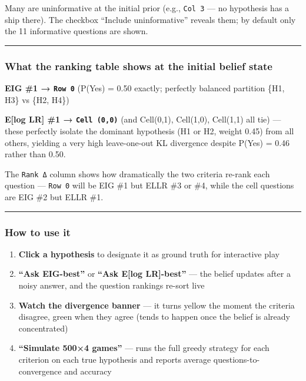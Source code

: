 \documentclass[
]{article}
\providecommand{\tightlist}{%
  \setlength{\itemsep}{0pt}\setlength{\parskip}{0pt}}
\begin{document}
Many are uninformative at the initial prior (e.g., \texttt{Col\ 3} ---
no hypothesis has a ship there). The checkbox ``Include uninformative''
reveals them; by default only the 11 informative questions are shown.

\begin{center}\rule{0.5\linewidth}{0.5pt}\end{center}

\subsubsection{What the ranking table shows at the initial belief
state}\label{what-the-ranking-table-shows-at-the-initial-belief-state}

\textbf{EIG \#1 → \texttt{Row\ 0}} (P(Yes) = 0.50 exactly; perfectly
balanced partition \{H1, H3\} vs \{H2, H4\})

\textbf{E{[}log LR{]} \#1 → \texttt{Cell\ (0,0)}} (and Cell(0,1),
Cell(1,0), Cell(1,1) all tie) --- these perfectly isolate the dominant
hypothesis (H1 or H2, weight 0.45) from all others, yielding a very high
leave-one-out KL divergence despite P(Yes) = 0.46 rather than 0.50.

The \texttt{Rank\ Δ} column shows how dramatically the two criteria
re-rank each question --- \texttt{Row\ 0} will be EIG \#1 but ELLR \#3
or \#4, while the cell questions are EIG \#2 but ELLR \#1.

\begin{center}\rule{0.5\linewidth}{0.5pt}\end{center}

\subsubsection{How to use it}\label{how-to-use-it}

\begin{enumerate}
\def\labelenumi{\arabic{enumi}.}
\tightlist
\item
  \textbf{Click a hypothesis} to designate it as ground truth for
  interactive play
\item
  \textbf{``Ask EIG-best''} or \textbf{``Ask E{[}log LR{]}-best''} ---
  the belief updates after a noisy answer, and the question rankings
  re-sort live
\item
  \textbf{Watch the divergence banner} --- it turns yellow the moment
  the criteria disagree, green when they agree (tends to happen once the
  belief is already concentrated)
\item
  \textbf{``Simulate 500×4 games''} --- runs the full greedy strategy
  for each criterion on each true hypothesis and reports average
  questions-to-convergence and accuracy
\end{enumerate}
\end{document}
